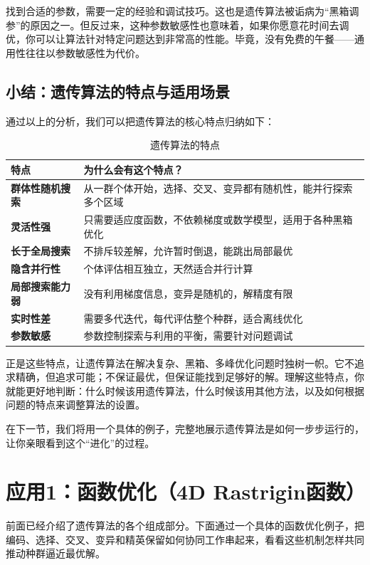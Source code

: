 \documentclass[lang=cn,zihao=-4,a4paper,fontset=windows]{beautybook}
\begin{document}
找到合适的参数，需要一定的经验和调试技巧。这也是遗传算法被诟病为“黑箱调参”的原因之一。但反过来，这种参数敏感性也意味着，如果你愿意花时间去调优，你可以让算法针对特定问题达到非常高的性能。毕竟，没有免费的午餐——通用性往往以参数敏感性为代价。

\subsection{小结：遗传算法的特点与适用场景}

通过以上的分析，我们可以把遗传算法的核心特点归纳如下：

\begin{table}[h]
\centering
\caption{遗传算法的特点}
\begin{tabular}{p{}p{}}
\toprule
\textbf{特点} & \textbf{为什么会有这个特点？} \\
\midrule
\textbf{群体性随机搜索} & 从一群个体开始，选择、交叉、变异都有随机性，能并行探索多个区域 \\
\hline
\textbf{灵活性强} & 只需要适应度函数，不依赖梯度或数学模型，适用于各种黑箱优化 \\
\hline
\textbf{长于全局搜索} & 不排斥较差解，允许暂时倒退，能跳出局部最优 \\
\hline
\textbf{隐含并行性} & 个体评估相互独立，天然适合并行计算 \\
\hline
\textbf{局部搜索能力弱} & 没有利用梯度信息，变异是随机的，解精度有限 \\
\hline
\textbf{实时性差} & 需要多代迭代，每代评估整个种群，适合离线优化 \\
\hline
\textbf{参数敏感} & 参数控制探索与利用的平衡，需要针对问题调试 \\
\bottomrule
\end{tabular}
\end{table}

正是这些特点，让遗传算法在解决复杂、黑箱、多峰优化问题时独树一帜。它不追求精确，但追求可能；不保证最优，但保证能找到足够好的解。理解这些特点，你就能更好地判断：什么时候该用遗传算法，什么时候该用其他方法，以及如何根据问题的特点来调整算法的设置。

在下一节，我们将用一个具体的例子，完整地展示遗传算法是如何一步步运行的，让你亲眼看到这个“进化”的过程。

\section{应用1：函数优化（4D Rastrigin函数）}

前面已经介绍了遗传算法的各个组成部分。下面通过一个具体的函数优化例子，把编码、选择、交叉、变异和精英保留如何协同工作串起来，看看这些机制怎样共同推动种群逼近最优解。
\end{document}
